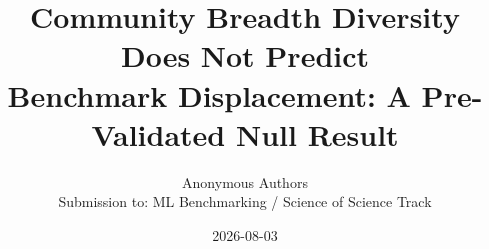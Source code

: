 \documentclass{article}
\title{Community Breadth Diversity Does Not Predict\\Benchmark Displacement: A Pre-Validated Null Result}
\author{Anonymous Authors\\
\small Submission to: ML Benchmarking / Science of Science Track}
\date{2026-08-03}
\begin{document}
\maketitle

\begin{abstract}

\end{abstract}












\newpage

\end{document}
